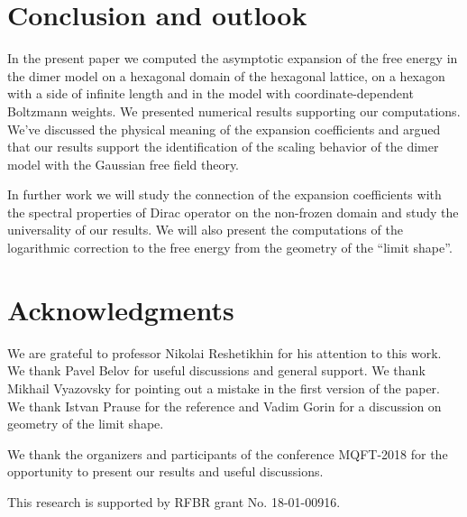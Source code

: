 \documentclass{article}
\begin{document}
\section*{Conclusion and outlook}
\label{sec:conclusion}

In the present paper we computed the asymptotic expansion of the free
energy in the dimer model on a hexagonal domain of the hexagonal
lattice, on a hexagon with a side of infinite length and in the model
with coordinate-dependent Boltzmann weights. We presented numerical
results supporting our computations. We've discussed the physical
meaning of the expansion coefficients and argued that our results
support the identification of the scaling behavior of the dimer model
with the Gaussian free field theory.

In further work we will study the connection of the expansion
coefficients with the spectral properties of Dirac operator on the
non-frozen domain and study the universality of our results. We will
also present the computations of the logarithmic correction to the free
energy from the geometry of the ``limit shape''.

\section*{Acknowledgments}
\label{sec:acknowledgements}
We are grateful to professor Nikolai Reshetikhin for his attention to
this work. We thank Pavel Belov for useful discussions and general
support. We thank Mikhail Vyazovsky for pointing out a mistake in the
first version of the paper. We thank Istvan Prause for the reference
\cite{allegra2015exact} and Vadim Gorin for a discussion on geometry
of the limit shape.

We thank the organizers and participants of the conference MQFT-2018
for the opportunity to present our results and useful discussions.

This research is supported by RFBR grant No. 18-01-00916.


{} 
\end{document}
